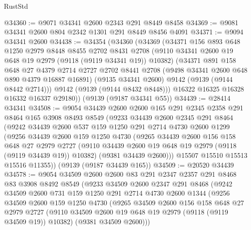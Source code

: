 \begin{lexlean}{RustStd}
\begin{coremodule}
@34360 := @9071 @34341 @2600 @2343 @291 @8449 @8458
@34369 := @9081 @34341 @2600 @804 @2342 @1301 @291 @8449 @8456 @4091
@34371 := @9094 @34341 @2600
@34438 := @34354
    (@34360
      (@34369
        (@34371
          @156
          @893
          @648
          @1250
          @2979
          @8448
          @8455
          @2702
          @8431
          @2708
          (@9110 @34341 @2600 @19 @648 @19 @2979 (@9118 (@9119 @34341 @19)) @10382)
          (@34371
            @891
            @158
            @648
            @27
            @4379
            @2714
            @2727
            @2702
            @8441
            @2708
            (@9498 @34341 @2600 @648 @890 @4379 @16887 @16891)
            (@9135 @34341 @2600)
            @9142
            (@9139 (@9144 @8442 @2714)))
          @9142
          (@9139 (@9144 @8432 @8448)))
        @16322
        @16325
        @16328
        @16332
        @16337
        @29180))
    (@9139 (@9187 @34341 @55))
@34439 := @28414 @34341
@34508 := @9054
    @34439
    @2600
    @2600
    @165
    @291
    @2345
    @2358
    @291
    @8464
    @165
    @3908
    @8493
    @8549
    (@9233
      @34439
      @2600
      @2345
      @291
      @8464
      (@9242
        @34439
        @2600
        @537
        @159
        @1250
        @291
        @2714
        @4730
        @2600
        @1299
        (@9256
          @34439
          @2600
          @159
          @1250
          @4730
          (@9265
            @34439
            @2600
            @156
            @158
            @648
            @27
            @2979
            @2727
            (@9110 @34439 @2600 @19 @648 @19 @2979 (@9118 (@9119 @34439 @19)) @10382)
            (@9381 @34439 @2600)))
        @15507
        @15510
        @15513
        @15516
        @11355))
    (@9139 (@9187 @34439 @165))
@34509 := @20520 @34439
@34578 := @9054
    @34509
    @2600
    @2600
    @83
    @291
    @2347
    @2357
    @291
    @8468
    @83
    @3908
    @8492
    @8549
    (@9233
      @34509
      @2600
      @2347
      @291
      @8468
      (@9242
        @34509
        @2600
        @731
        @159
        @1250
        @291
        @2714
        @4730
        @2600
        @1344
        (@9256
          @34509
          @2600
          @159
          @1250
          @4730
          (@9265
            @34509
            @2600
            @156
            @158
            @648
            @27
            @2979
            @2727
            (@9110 @34509 @2600 @19 @648 @19 @2979 (@9118 (@9119 @34509 @19)) @10382)
            (@9381 @34509 @2600)))

\end{coremodule}
\end{lexlean}
